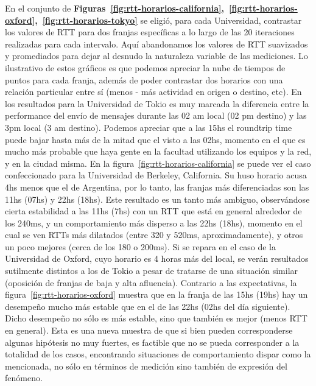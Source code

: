 \indent En el conjunto de \textbf{Figuras~\ref{fig:rtt-horarios-california},~\ref{fig:rtt-horarios-oxford},~\ref{fig:rtt-horarios-tokyo}} se eligió, para cada Universidad, contrastar los valores de RTT para dos franjas específicas a lo largo de las 20 iteraciones realizadas para cada intervalo. Aquí abandonamos los valores de RTT suavizados y promediados para dejar al desnudo la naturaleza variable de las mediciones. Lo ilustrativo de estos gráficos es que podemos apreciar la nube de tiempos de puntos para cada franja, además de poder contrastar dos horarios con una relación particular entre sí (menos - más actividad en origen o destino, etc). En los resultados para la Universidad de Tokio es muy marcada la diferencia entre la performance del envío de mensajes durante las 02 am local (02 pm destino) y las 3pm local (3 am destino). Podemos apreciar que a las 15hs el roundtrip time puede bajar hasta más de la mitad que el visto a las 02hs, momento en el que es mucho más probable que haya gente en la facultad utilizando los equipos y la red, y en la ciudad misma. En la figura~\ref{fig:rtt-horarios-california} se puede ver el caso confeccionado para la Universidad de Berkeley, California. Su huso horario acusa 4hs menos que el de Argentina, por lo tanto, las franjas más diferenciadas son las 11hs (07hs) y 22hs (18hs). Este resultado es un tanto más ambiguo, observándose cierta estabilidad a las 11hs (7hs) con un RTT que está en general alrededor de los 240ms, y un comportamiento más disperso a las 22hs (18hs), momento en el cual se ven RTTs más dilatados (entre 320 y 520ms, aproximadamente), y otros un poco mejores (cerca de los 180 o 200ms). Si se repara en el caso de la Universidad de Oxford, cuyo horario es 4 horas más del local, se verán resultados sutilmente distintos a los de Tokio a pesar de tratarse de una situación similar (oposición de franjas de baja y alta afluencia). Contrario a las expectativas, la figura~\ref{fig:rtt-horarios-oxford} muestra que en la franja de las 15hs (19hs) hay un desempeño mucho más estable que en el de las 22hs (02hs del día siguiente). Dicho desempeño no sólo es más estable, sino que también es mejor (menos RTT en general). Esta es una nueva muestra de que si bien pueden corresponderse algunas hipótesis no muy fuertes, es factible que no se pueda corresponder a la totalidad de los casos, encontrando situaciones de comportamiento dispar como la mencionada, no sólo en términos de medición sino también de expresión del fenómeno.\\

